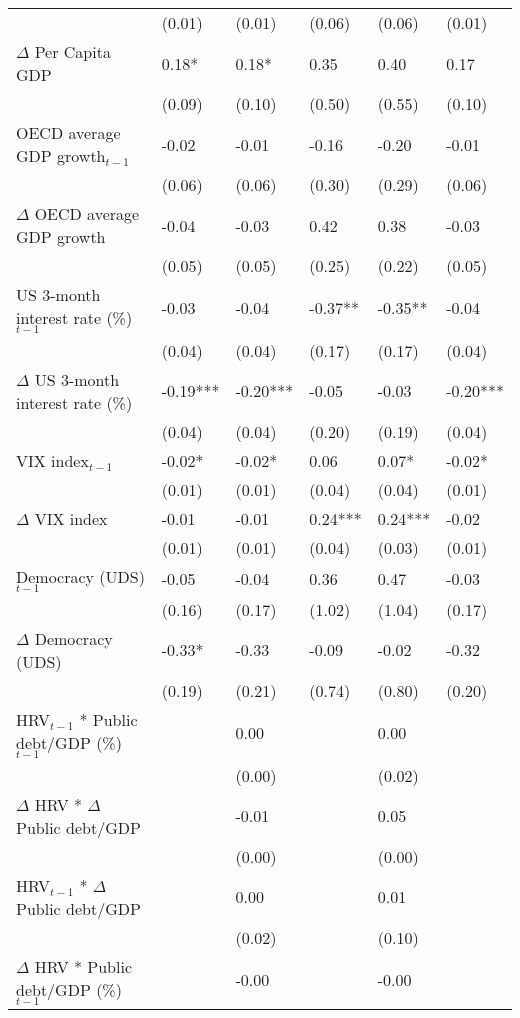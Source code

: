 \begin{tabular}{lp{3cm}p{3cm}p{3cm}p{3cm}p{3cm}}
   & (0.01) & (0.01) & (0.06) & (0.06) & (0.01) \\ 
  $\Delta$ Per Capita GDP & 0.18* & 0.18* & 0.35 & 0.40 & 0.17 \\ 
   & (0.09) & (0.10) & (0.50) & (0.55) & (0.10) \\ 
  OECD average GDP growth$_{t-1}$ & -0.02 & -0.01 & -0.16 & -0.20 & -0.01 \\ 
   & (0.06) & (0.06) & (0.30) & (0.29) & (0.06) \\ 
  $\Delta$ OECD average GDP growth & -0.04 & -0.03 & 0.42 & 0.38 & -0.03 \\ 
   & (0.05) & (0.05) & (0.25) & (0.22) & (0.05) \\ 
  US 3-month interest rate (\%)$_{t-1}$ & -0.03 & -0.04 & -0.37** & -0.35** & -0.04 \\ 
   & (0.04) & (0.04) & (0.17) & (0.17) & (0.04) \\ 
  $\Delta$ US 3-month interest rate (\%) & -0.19*** & -0.20*** & -0.05 & -0.03 & -0.20*** \\ 
   & (0.04) & (0.04) & (0.20) & (0.19) & (0.04) \\ 
  VIX index$_{t-1}$ & -0.02* & -0.02* & 0.06 & 0.07* & -0.02* \\ 
   & (0.01) & (0.01) & (0.04) & (0.04) & (0.01) \\ 
  $\Delta$ VIX index & -0.01 & -0.01 & 0.24*** & 0.24*** & -0.02 \\ 
   & (0.01) & (0.01) & (0.04) & (0.03) & (0.01) \\ 
  Democracy (UDS)$_{t-1}$ & -0.05 & -0.04 & 0.36 & 0.47 & -0.03 \\ 
   & (0.16) & (0.17) & (1.02) & (1.04) & (0.17) \\ 
  $\Delta$ Democracy (UDS) & -0.33* & -0.33 & -0.09 & -0.02 & -0.32 \\ 
   & (0.19) & (0.21) & (0.74) & (0.80) & (0.20) \\ 
  HRV$_{t-1}$ * Public debt/GDP (\%)$_{t-1}$ &  & 0.00 &  & 0.00 &  \\ 
   &  & (0.00) &  & (0.02) &  \\ 
  $\Delta$ HRV * $\Delta$ Public debt/GDP &  & -0.01 &  & 0.05 &  \\ 
   &  & (0.00) &  & (0.00) &  \\ 
  HRV$_{t-1}$ * $\Delta$ Public debt/GDP &  & 0.00 &  & 0.01 &  \\ 
   &  & (0.02) &  & (0.10) &  \\ 
  $\Delta$ HRV * Public debt/GDP (\%)$_{t-1}$ &  & -0.00 &  & -0.00 &  \\ 

\end{tabular}
